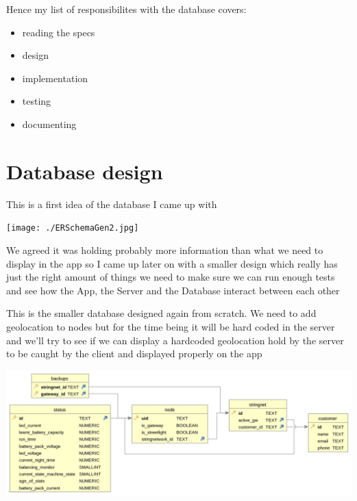 \documentclass[a4paper,12pt]{book}
\begin{document}
Hence my list of responsibilites with the database covers:

\begin{itemize}
\item {reading the specs}
\item design
\item implementation
\item testing 
\item documenting
\end{itemize}

\clearpage

\chapter{Database design}
This is a first idea of the database I came up with

\noindent\texttt{[image: ./ERSchemaGen2.jpg]}

We agreed it was holding probably more information than what we need to display in the app so I came up later on with a smaller design which really has just the right amount of things we need to make sure we can run enough tests and see how the App, the Server and the Database interact between each other
\clearpage

This is the smaller database designed again from scratch. We need to add geolocation to nodes but for the time being it will be hard coded in the server and we'll try to see if we can display a hardcoded geolocation hold by the server to be caught by the client and displayed properly on the app

\noindent\includegraphics[width=14cm]{./SecondERSchemaGen2.jpg}

\printindex
\end{document}
